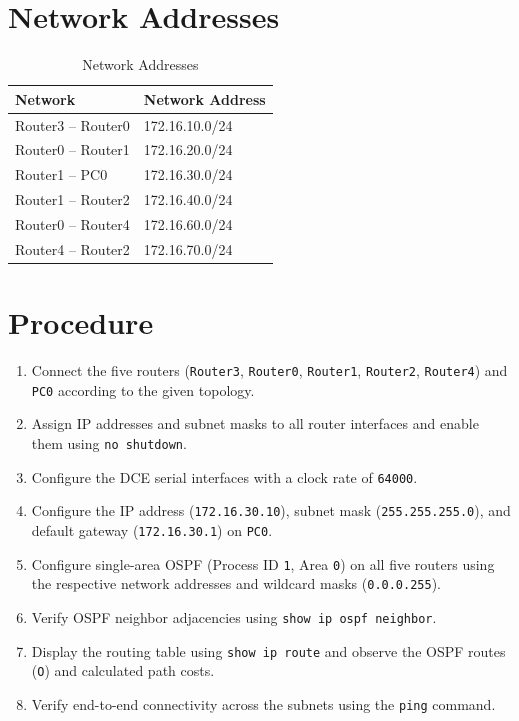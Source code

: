 \documentclass[12pt, a4paper]{report}
\begin{document}
\section*{Network Addresses}
\begin{table}[H]
	\centering
	\begin{tabular}{|l|l|}
		\hline
		\textbf{Network} & \textbf{Network Address} \\ \hline
		Router3 -- Router0 & 172.16.10.0/24 \\ \hline
		Router0 -- Router1 & 172.16.20.0/24 \\ \hline
		Router1 -- PC0     & 172.16.30.0/24 \\ \hline
		Router1 -- Router2 & 172.16.40.0/24 \\ \hline
		Router0 -- Router4 & 172.16.60.0/24 \\ \hline
		Router4 -- Router2 & 172.16.70.0/24 \\ \hline
	\end{tabular}
	\caption{Network Addresses}
\end{table}

\section*{Procedure}
\begin{enumerate}
	\item Connect the five routers (\texttt{Router3}, \texttt{Router0}, \texttt{Router1}, \texttt{Router2}, \texttt{Router4}) and \texttt{PC0} according to the given topology.
	\item Assign IP addresses and subnet masks to all router interfaces and enable them using \texttt{no shutdown}.
	\item Configure the DCE serial interfaces with a clock rate of \texttt{64000}.
	\item Configure the IP address (\texttt{172.16.30.10}), subnet mask (\texttt{255.255.255.0}), and default gateway (\texttt{172.16.30.1}) on \texttt{PC0}.
	\item Configure single-area OSPF (Process ID \texttt{1}, Area \texttt{0}) on all five routers using the respective network addresses and wildcard masks (\texttt{0.0.0.255}).
	\item Verify OSPF neighbor adjacencies using \texttt{show ip ospf neighbor}.
	\item Display the routing table using \texttt{show ip route} and observe the OSPF routes (\texttt{O}) and calculated path costs.
	\item Verify end-to-end connectivity across the subnets using the \texttt{ping} command.
\end{enumerate}
\end{document}
